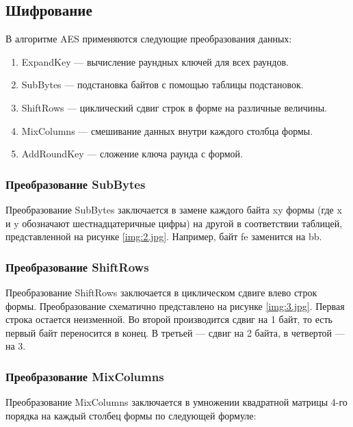 \subsection{Шифрование}

В алгоритме AES применяются следующие преобразования данных:

\begin{enumerate}
	\item ExpandKey — вычисление раундных ключей для всех раундов.
	\item SubBytes — подстановка байтов с помощью таблицы подстановок.
	\item ShiftRows — циклический сдвиг строк в форме на различные величины.
	\item MixColumns — смешивание данных внутри каждого столбца формы.
	\item AddRoundKey — сложение ключа раунда с формой.
\end{enumerate}

\subsubsection*{Преобразование SubBytes}
Преобразование SubBytes заключается в замене каждого байта {xy} формы (где x и y обозначают шестнадцатеричные цифры) на другой в соответствии таблицей, представленной на рисунке \ref{img:2.jpg}. Например, байт {fe} заменится на {bb}.


\subsubsection*{Преобразование ShiftRows}
Преобразование ShiftRows заключается в циклическом сдвиге влево строк формы. Преобразование схематично представлено на рисунке \ref{img:3.jpg}.
Первая строка остается неизменной. Во второй производится сдвиг на 1 байт, то есть первый байт переносится в конец. В третьей — сдвиг на 2 байта, в четвертой — на 3.



\subsubsection*{Преобразование MixColumns}

Преобразование MixColumns заключается в умножении квадратной матрицы 4-го порядка на каждый столбец формы по
следующей формуле:

